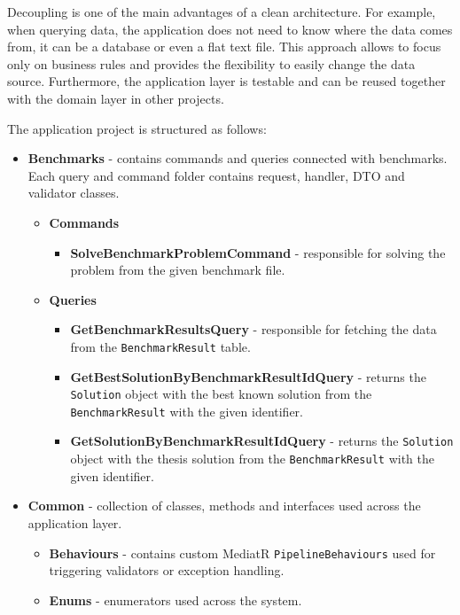 \documentclass[a4paper,twoside,12pt]{book}
\begin{document}
Decoupling is one of the main advantages of a clean architecture. For example, when querying data, the application does not need to know where the data comes from, it can be a database or even a flat text file. This approach allows to focus only on business rules and provides the flexibility to easily change the data source. Furthermore, the application layer is testable and can be reused together with the domain layer in other projects.

The application project is structured as follows: 


\begin{itemize}
    \item \textbf{Benchmarks} - contains commands and queries connected with benchmarks. Each query and command folder contains request, handler, DTO and validator classes.
    \begin{itemize}
    \item \textbf{Commands}
        \begin{itemize}
        \item \textbf{SolveBenchmarkProblemCommand} - responsible for solving the problem from the given benchmark file. 
        \end{itemize}
    \item \textbf{Queries}
        \begin{itemize}
        \item \textbf{GetBenchmarkResultsQuery} - responsible for fetching the data from the \lstinline{BenchmarkResult} table.
        \item \textbf{GetBestSolutionByBenchmarkResultIdQuery} - returns the \lstinline{Solution} object with the best known solution from the \lstinline{BenchmarkResult} with the given identifier.
        \item \textbf{GetSolutionByBenchmarkResultIdQuery} - returns the \lstinline{Solution} object with the thesis solution from the \lstinline{BenchmarkResult} with the given identifier.
        \end{itemize}
    \end{itemize}
\item \textbf{Common} - collection of classes, methods and interfaces used across the application layer.
    \begin{itemize}
        \item \textbf{Behaviours} - contains custom MediatR \lstinline{PipelineBehaviours} used for triggering validators or exception handling.
        \item \textbf{Enums} - enumerators used across the system.

\end{itemize}
\end{itemize}
\end{document}
